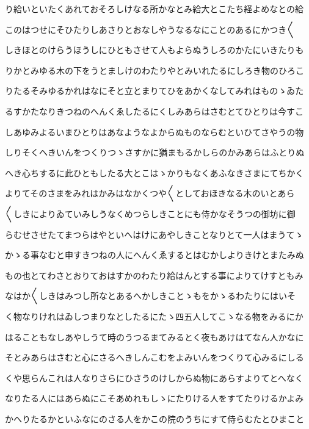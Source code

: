 \documentclass[a4paper,11pt,landscape]{ltjtarticle}
\begin{document}
\par\medskip
り給いといたくあれておそろしけなる所かなとみ給大とこたち経よめなとの給
\par\medskip
このはつせにそひたりしあさりとおなしやうなるなにことのあるにかつき〱
\par\medskip
しきほとのけらうほうしにひともさせて人もよらぬうしろのかたにいきたりも
\par\medskip
りかとみゆる木の下をうとましけのわたりやとみいれたるにしろき物のひろこ
\par\medskip
りたるそみゆるかれはなにそと立とまりてひをあかくなしてみれはものゝゐた
\par\medskip
るすかたなりきつねのへんくゑしたるにくしみあらはさむとてひとりは今すこ
\par\medskip
しあゆみよるいまひとりはあなようなよからぬものならむといひてさやうの物
\par\medskip
しりそくへきいんをつくりつゝさすかに猶まもるかしらのかみあらはふとりぬ
\par\medskip
へき心ちするに此ひともしたる大とこはゝかりもなくあふなきさまにてちかく
\par\medskip
よりてそのさまをみれはかみはなかくつや〱としておほきなる木のいとあら
\par\medskip
〱しきによりゐていみしうなくめつらしきことにも侍かなそうつの御坊に御
\par\medskip
らむせさせたてまつらはやといへはけにあやしきことなりとて一人はまうてゝ
\par\medskip
かゝる事なむと申すきつねの人にへんくゑするとはむかしよりきけとまたみぬ
\par\medskip
もの也とてわさとおりておはすかのわたり給はんとする事によりてけすともみ
\par\medskip
なはか〱しきはみつし所なとあるへかしきことゝもをかゝるわたりにはいそ
\par\medskip
く物なりけれはゐしつまりなとしたるにたゝ四五人してこゝなる物をみるにか
\par\medskip
はることもなしあやしうて時のうつるまてみるとく夜もあけはてなん人かなに
\par\medskip
そとみあらはさむと心にさるへきしんこむをよみいんをつくりて心みるにしる
\par\medskip
くや思らんこれは人なりさらにひさうのけしからぬ物にあらすよりてとへなく
\par\medskip
なりたる人にはあらぬにこそあめれもしゝにたりける人をすてたりけるかよみ
\par\medskip
かへりたるかといふなにのさる人をかこの院のうちにすて侍らむたとひまこと
\par\medskip
\end{document}
